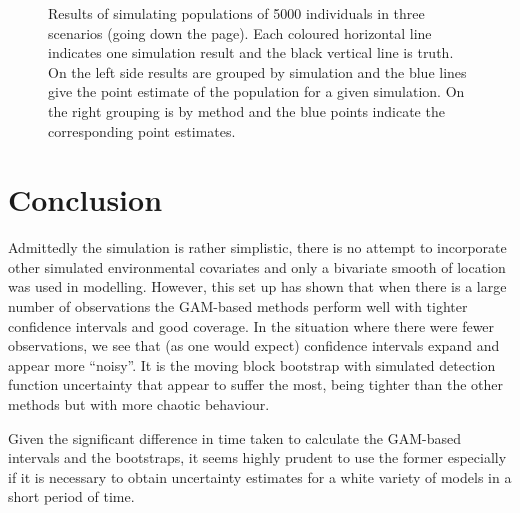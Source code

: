 \documentclass[11pt]{amsart}
\begin{document}
\begin{figure}
\begin{center}
\setlength{\tabcolsep}{0mm}
%
%
\caption{Results of simulating populations of 5000 individuals in three scenarios (going down the page). Each coloured horizontal line indicates one simulation result and the black vertical line is truth. On the left side results are grouped by simulation and the blue lines give the point estimate of the population for a given simulation. On the right grouping is by method and the blue points indicate the corresponding point estimates.}
\label{res-500}
\end{center}
\end{figure}

\section{Conclusion}

Admittedly the simulation is rather simplistic, there is no attempt to incorporate other simulated environmental covariates and only a bivariate smooth of location was used in modelling. However, this set up has shown that when there is a large number of observations the GAM-based methods perform well with tighter confidence intervals and good coverage. In the situation where there were fewer observations, we see that (as one would expect) confidence intervals expand and appear more ``noisy''. It is the moving block bootstrap with simulated detection function uncertainty that appear to suffer the most, being tighter than the other methods but with more chaotic behaviour.

Given the significant difference in time taken to calculate the GAM-based intervals and the bootstraps, it seems highly prudent to use the former especially if it is necessary to obtain uncertainty estimates for a white variety of models in a short period of time.


\end{document}
